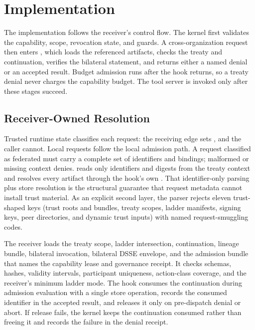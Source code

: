 \section{Implementation}
\label{sec:implementation}

The implementation follows the receiver's control flow. The kernel first
validates the capability, scope, revocation state, and guards. A
cross-organization request then enters
, which loads the referenced
artifacts, checks the treaty and continuation, verifies the bilateral
statement, and returns either a named denial or an accepted result. Budget
admission runs after the hook returns, so a treaty denial never charges the
capability budget. The tool server is invoked only after these stages succeed.

\subsection{Receiver-Owned Resolution}

Trusted runtime state classifies each request: the receiving edge sets
, and the caller cannot. Local requests
follow the local admission path. A request classified as federated must carry
a complete set of identifiers and bindings; malformed or missing context
denies.  reads only identifiers and digests
from the treaty context and resolves every artifact through the hook's own
. That identifier-only parsing plus store
resolution is the structural guarantee that request metadata cannot install
trust material. As an explicit second layer, the parser rejects eleven
trust-shaped keys (trust roots and bundles, treaty scopes, ladder manifests,
signing keys, peer directories, and dynamic trust inputs) with named
request-smuggling codes.

The receiver loads the treaty scope, ladder intersection, continuation,
lineage bundle, bilateral invocation, bilateral DSSE envelope, and the
admission bundle that names the capability lease and governance receipt. It
checks schemas, hashes, validity intervals, participant uniqueness,
action-class coverage, and the receiver's minimum ladder mode. The hook
consumes the continuation during admission evaluation with a single store
operation, records the consumed identifier in the accepted result, and
releases it only on pre-dispatch denial or abort. If release fails, the kernel
keeps the continuation consumed rather than freeing it and records the failure
in the denial receipt.

